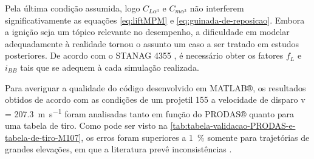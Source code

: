 Pela última condição assumida, logo \(C_{L\alpha^{3}}\) e \(C_{m\alpha^{3}}\) não interferem significativamente as equações \ref{eq:liftMPM} e \ref{eq:guinada-de-reposicao}. Embora a ignição seja um tópico relevante no desempenho, a dificuldade em modelar adequadamente à realidade tornou o assunto um caso a ser tratado em estudos posteriores.
De acordo com o STANAG 4355 \cite{stanag4355}, é necessário obter os fatores \(f_{L}\) e \(i_{BB}\) tais que se adequem à cada simulação realizada. 

Para averiguar a qualidade do código desenvolvido em MATLAB®, os resultados obtidos de acordo com as condições de um projetil \qty{155}{\millimetre} a velocidade de disparo v = \qty{207,3}{\metre\per\second} foram analisadas tanto em função do PRODAS® quanto para uma tabela de tiro. Como pode ser visto na \autoref{tab:tabela-validacao-PRODAS-e-tabela-de-tiro-M107}, os erros foram superiores a \qty{1}{\percent} somente para trajetórias de grandes elevações, em que a literatura prevê inconsistências \cite{McCoy2012,Carlucci2018}.

